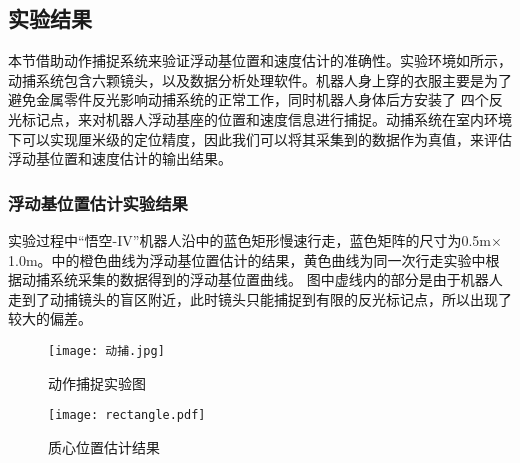 \begin{algorithm}[h]
\end{algorithm}
\subsection{实验结果}
本节借助动作捕捉系统来验证浮动基位置和速度估计的准确性。实验环境如所示，动捕系统包含六颗镜头，以及数据分析处理软件。机器人身上穿的衣服主要是为了避免金属零件反光影响动捕系统的正常工作，同时机器人身体后方安装了
四个反光标记点，来对机器人浮动基座的位置和速度信息进行捕捉。动捕系统在室内环境下可以实现厘米级的定位精度，因此我们可以将其采集到的数据作为真值，来评估浮动基位置和速度估计的输出结果。
\subsubsection{浮动基位置估计实验结果}
实验过程中“悟空-IV”机器人沿中的蓝色矩形慢速行走，蓝色矩阵的尺寸为0.5m$\times$1.0m。中的橙色曲线为浮动基位置估计的结果，黄色曲线为同一次行走实验中根据动捕系统采集的数据得到的浮动基位置曲线。
图中虚线内的部分是由于机器人走到了动捕镜头的盲区附近，此时镜头只能捕捉到有限的反光标记点，所以出现了较大的偏差。
\begin{figure}[htbp]
    \centering
    \texttt{[image: 动捕.jpg]}
    \caption{\label{fig:capture_exp}动作捕捉实验图}
\end{figure}

\begin{figure}[htbp]
    \centering
    \texttt{[image: rectangle.pdf]}
    \caption{\label{fig:com_pos_est}质心位置估计结果}
\end{figure}
